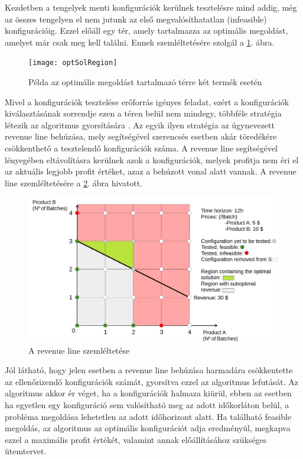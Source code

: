 Kezdetben a tengelyek menti konfigurációk kerülnek tesztelésre mind addig, még az összes tengelyen el nem jutunk az első megvalósíthatatlan (infeasible) konfigurációig.
Ezzel előáll egy tér, amely tartalmazza az optimális megoldást, amelyet már csak meg kell találni.
Ennek szemléltetésére szolgál a \ref{optSolRegion}.  ábra.
 \begin{figure}[H]
\begin{center}
\texttt{[image: optSolRegion]}
\caption{Példa az optimális megoldást tartalmazó térre két termék esetén}
\label{optSolRegion}
\end{center}
\end{figure}
Mivel a konfigurációk tesztelése erőforrás igényes feladat, ezért a konfigurációk kiválasztásának sorrendje ezen a téren belül nem mindegy, többféle stratégia létezik az algoritmus gyorsítására \cite{phd_Hegyhati}.
Az egyik ilyen stratégia az úgynevezett revenue line behúzása, mely segítségével szerencsés esetben akár töredékére csökkenthető a tesztelendő konfigurációk száma.
A revenue line segítségével lényegében eltávolításra kerülnek azok a konfigurációk, melyek profitja nem éri el az aktuális legjobb profit értéket, azaz a behúzott vonal alatt vannak.
A revenue line szemléltetésére a \ref{revLine}. ábra hivatott.
 \begin{figure}[H]
\begin{center}
\includegraphics[scale=0.4]{revLine}
\caption{A revenue line szemléltetése}
\label{revLine}
\end{center}
\end{figure}
Jól látható, hogy jelen esetben a revenue line behúzása harmadára csökkentette az ellenőrizendő konfigurációk számát, gyorsítva ezzel az algoritmus lefutását.
Az algoritmus akkor ér véget, ha a konfigurációk halmaza kiürül, ebben az esetben ha egyetlen egy konfiguráció sem valósítható meg az adott időkorláton belül, a probléma megoldása lehetetlen az adott időhorizont alatt.
Ha található feasible megoldás, az algoritmus az optimális konfigurációt adja eredményül, megkapva ezzel a maximális profit értékét, valamint annak előállításához szükséges ütemtervet.
